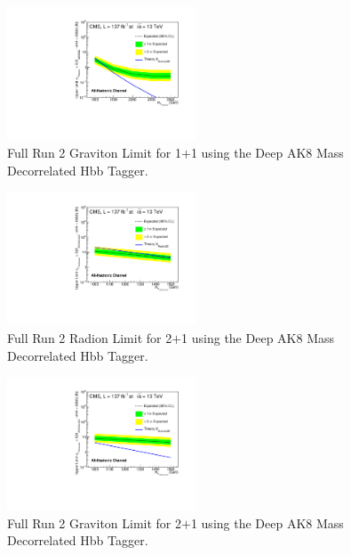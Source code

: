 \begin{figure}[!htb]
	\centering
	\includegraphics[width=0.5\textwidth]{Figures/limits_combine_137fb_dak8MDHbb_signalsAll_GravNar_MERGED.pdf}
	\caption{Full Run 2 Graviton Limit for 1$+$1 using the Deep AK8 Mass Decorrelated Hbb Tagger.}
	\label{fig:GravitonLimitMerged}
\end{figure}

\begin{figure}[!htb]
	\centering
	\includegraphics[width=0.5\textwidth]{Figures/limits_combine_137fb_dak8MDHbb_signalsAll_RadNar_SRESOLVED.pdf}
	\caption{Full Run 2 Radion Limit for 2$+$1 using the Deep AK8 Mass Decorrelated Hbb Tagger.}
	\label{fig:RadionLimitSResolved}
\end{figure}

\begin{figure}[!htb]
	\centering
	\includegraphics[width=0.5\textwidth]{Figures/limits_combine_137fb_dak8MDHbb_signalsAll_GravNar_SRESOLVED.pdf}
	\caption{Full Run 2 Graviton Limit for 2$+$1 using the Deep AK8 Mass Decorrelated Hbb Tagger.}
	\label{fig:GravitonLimitSResolved}
\end{figure}

